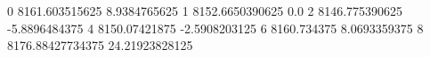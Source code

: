 0 8161.603515625 8.9384765625
1 8152.6650390625 0.0
2 8146.775390625 -5.8896484375
4 8150.07421875 -2.5908203125
6 8160.734375 8.0693359375
8 8176.88427734375 24.21923828125
